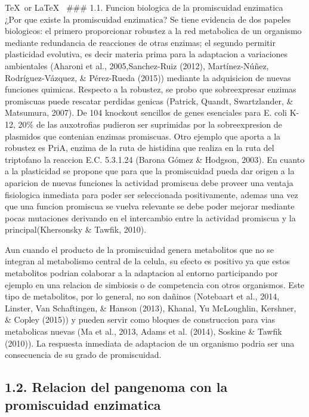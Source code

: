 \documentclass[12pt,twoside]{reedthesis}
\begin{document}
  \TeX~or \LaTeX~ \#\#\# 1.1. Funcion biologica de la promiscuidad
  enzimatica\\
  ¿Por que existe la promiscuidad enzimatica? Se tiene evidencia de dos
  papeles biologicos: el primero proporcionar robustez a la red metabolica
  de un organismo mediante redundancia de reacciones de otras enzimas; el
  segundo permitir plasticidad evolutiva, es decir materia prima para la
  adaptacion a variaciones ambientales (Aharoni et al., 2005,Sanchez-Ruiz
  (2012), Martínez-Núñez, Rodríguez-Vázquez, \& Pérez-Rueda (2015))
  mediante la adquisicion de nuevas funciones quimicas. Respecto a la
  robustez, se probo que sobreexpresar enzimas promiscuas puede rescatar
  perdidas genicas (Patrick, Quandt, Swartzlander, \& Matsumura, 2007). De
  104 knockout sencillos de genes esenciales para E. coli K-12, 20\% de
  las auxotrofias pudieron ser suprimidas por la sobreexpresion de
  plasmidos que contenian enzimas promiscuas. Otro ejemplo que aporta a la
  robustez es PriA, enzima de la ruta de histidina que realiza en la ruta
  del triptofano la reaccion E.C. 5.3.1.24 (Barona Gómez \& Hodgson,
  2003). En cuanto a la plasticidad se propone que para que la
  promiscuidad pueda dar origen a la aparicion de nuevas funciones la
  actividad promiscua debe proveer una ventaja fisiologica inmediata para
  poder ser seleccionada positivamente, ademas una vez que una funcion
  promiscua se vuelva relevante se debe poder mejorar mediante pocas
  mutaciones derivando en el intercambio entre la actividad promiscua y la
  principal(Khersonsky \& Tawfik, 2010).
  
  Aun cuando el producto de la promiscuidad genera metabolitos que no se
  integran al metabolismo central de la celula, su efecto es positivo ya
  que estos metabolitos podrian colaborar a la adaptacion al entorno
  participando por ejemplo en una relacion de simbiosis o de competencia
  con otros organismos. Este tipo de metabolitos, por lo general, no son
  dañinos (Notebaart et al., 2014, Linster, Van Schaftingen, \& Hanson
  (2013), Khanal, Yu McLoughlin, Kershner, \& Copley (2015)) y pueden
  servir como bloques de construccion para vias metabolicas nuevas (Ma et
  al., 2013, Adams et al. (2014), Soskine \& Tawfik (2010)). La respuesta
  inmediata de adaptacion de un organismo podria ser una consecuencia de
  su grado de promiscuidad.
  
  \subsection{1.2. Relacion del pangenoma con la promiscuidad
  enzimatica}\label{relacion-del-pangenoma-con-la-promiscuidad-enzimatica}
  
\end{document}
